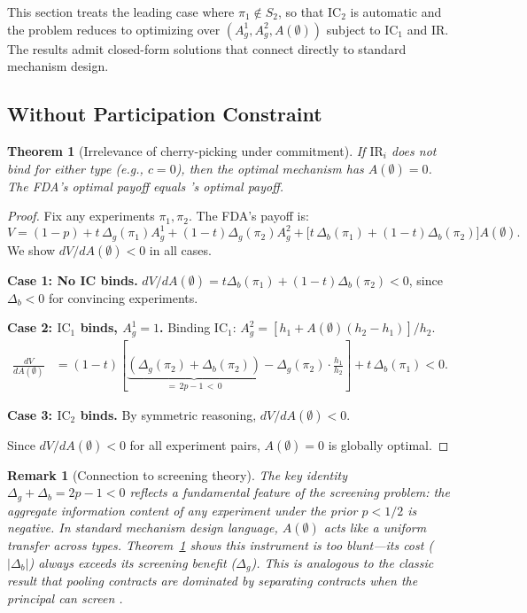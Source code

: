 \documentclass[12pt,a4paper]{article}
\newtheorem{theorem}{Theorem}
\newtheorem{remark}{Remark}
\begin{document}
This section treats the leading case where $\pi_1 \notin S_2$,
so that $\mathrm{IC}_2$ is automatic and the problem reduces to
optimizing over $(A_g^1, A_g^2, A(\emptyset))$ subject to
$\mathrm{IC}_1$ and $\mathrm{IR}$. The results admit
closed-form solutions that connect directly to standard
mechanism design.

\subsection{Without Participation Constraint}

\begin{theorem}[Irrelevance of cherry-picking under
  commitment]\label{thm:no_IR}
If $\mathrm{IR}_i$ does not bind for either type (e.g.,
$c = 0$), then the optimal mechanism has
$A(\emptyset) = 0$. The FDA's optimal payoff equals
\citet{min2023}'s optimal payoff.
\end{theorem}

\begin{proof}
Fix any experiments $\pi_1, \pi_2$. The FDA's payoff is:
\[
  V = (1-p)
    + t \, \Delta_g(\pi_1) A_g^1
    + (1-t) \Delta_g(\pi_2) A_g^2
    + \bigl[t \, \Delta_b(\pi_1)
      + (1-t) \Delta_b(\pi_2)\bigr] A(\emptyset).
\]
We show $dV/dA(\emptyset) < 0$ in all cases.

\medskip
\noindent\textbf{Case 1: No IC binds.}
$dV/dA(\emptyset) = t \Delta_b(\pi_1)
+ (1-t) \Delta_b(\pi_2) < 0$,
since $\Delta_b < 0$ for convincing experiments.

\medskip
\noindent\textbf{Case 2: $\mathrm{IC}_1$ binds,
$A_g^1 = 1$.}
Binding $\mathrm{IC}_1$:
$A_g^2 = [h_1 + A(\emptyset)(h_2 - h_1)]/h_2$.
\begin{align*}
  \frac{dV}{dA(\emptyset)}
  &= (1-t)\left[
       \underbrace{(\Delta_g(\pi_2) + \Delta_b(\pi_2))}
         _{= \, 2p-1 \, < \, 0}
       - \Delta_g(\pi_2) \cdot \frac{h_1}{h_2}
     \right]
     + t \, \Delta_b(\pi_1) < 0.
\end{align*}

\medskip
\noindent\textbf{Case 3: $\mathrm{IC}_2$ binds.}
By symmetric reasoning, $dV/dA(\emptyset) < 0$.

\medskip
Since $dV/dA(\emptyset) < 0$ for all experiment pairs,
$A(\emptyset) = 0$ is globally optimal.
\end{proof}

\begin{remark}[Connection to screening theory]
\label{rem:screening}
The key identity $\Delta_g + \Delta_b = 2p - 1 < 0$ reflects
a fundamental feature of the screening problem: the
\emph{aggregate information content} of any experiment under
the prior $p < 1/2$ is negative. In standard mechanism design
language, $A(\emptyset)$ acts like a \emph{uniform transfer}
across types. Theorem~\ref{thm:no_IR} shows this instrument
is too blunt---its cost ($|\Delta_b|$) always exceeds its
screening benefit ($\Delta_g$). This is analogous to the
classic result that pooling contracts are dominated by
separating contracts when the principal can screen
\citep{maskinriley1984}.
\end{remark}
\end{document}
